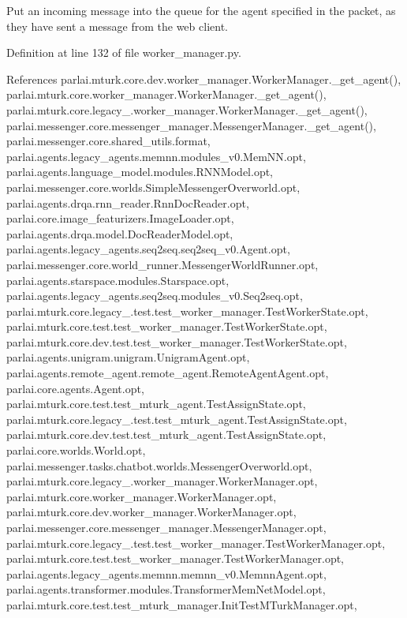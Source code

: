 \begin{DoxyVerb}Put an incoming message into the queue for the agent specified in
the packet, as they have sent a message from the web client.
\end{DoxyVerb}
 

Definition at line 132 of file worker\+\_\+manager.\+py.



References parlai.\+mturk.\+core.\+dev.\+worker\+\_\+manager.\+Worker\+Manager.\+\_\+get\+\_\+agent(), parlai.\+mturk.\+core.\+worker\+\_\+manager.\+Worker\+Manager.\+\_\+get\+\_\+agent(), parlai.\+mturk.\+core.\+legacy\+\_.\+worker\+\_\+manager.\+Worker\+Manager.\+\_\+get\+\_\+agent(), parlai.\+messenger.\+core.\+messenger\+\_\+manager.\+Messenger\+Manager.\+\_\+get\+\_\+agent(), parlai.\+messenger.\+core.\+shared\+\_\+utils.\+format, parlai.\+agents.\+legacy\+\_\+agents.\+memnn.\+modules\+\_\+v0.\+Mem\+N\+N.\+opt, parlai.\+agents.\+language\+\_\+model.\+modules.\+R\+N\+N\+Model.\+opt, parlai.\+messenger.\+core.\+worlds.\+Simple\+Messenger\+Overworld.\+opt, parlai.\+agents.\+drqa.\+rnn\+\_\+reader.\+Rnn\+Doc\+Reader.\+opt, parlai.\+core.\+image\+\_\+featurizers.\+Image\+Loader.\+opt, parlai.\+agents.\+drqa.\+model.\+Doc\+Reader\+Model.\+opt, parlai.\+agents.\+legacy\+\_\+agents.\+seq2seq.\+seq2seq\+\_\+v0.\+Agent.\+opt, parlai.\+messenger.\+core.\+world\+\_\+runner.\+Messenger\+World\+Runner.\+opt, parlai.\+agents.\+starspace.\+modules.\+Starspace.\+opt, parlai.\+agents.\+legacy\+\_\+agents.\+seq2seq.\+modules\+\_\+v0.\+Seq2seq.\+opt, parlai.\+mturk.\+core.\+legacy\+\_.\+test.\+test\+\_\+worker\+\_\+manager.\+Test\+Worker\+State.\+opt, parlai.\+mturk.\+core.\+test.\+test\+\_\+worker\+\_\+manager.\+Test\+Worker\+State.\+opt, parlai.\+mturk.\+core.\+dev.\+test.\+test\+\_\+worker\+\_\+manager.\+Test\+Worker\+State.\+opt, parlai.\+agents.\+unigram.\+unigram.\+Unigram\+Agent.\+opt, parlai.\+agents.\+remote\+\_\+agent.\+remote\+\_\+agent.\+Remote\+Agent\+Agent.\+opt, parlai.\+core.\+agents.\+Agent.\+opt, parlai.\+mturk.\+core.\+test.\+test\+\_\+mturk\+\_\+agent.\+Test\+Assign\+State.\+opt, parlai.\+mturk.\+core.\+legacy\+\_.\+test.\+test\+\_\+mturk\+\_\+agent.\+Test\+Assign\+State.\+opt, parlai.\+mturk.\+core.\+dev.\+test.\+test\+\_\+mturk\+\_\+agent.\+Test\+Assign\+State.\+opt, parlai.\+core.\+worlds.\+World.\+opt, parlai.\+messenger.\+tasks.\+chatbot.\+worlds.\+Messenger\+Overworld.\+opt, parlai.\+mturk.\+core.\+legacy\+\_.\+worker\+\_\+manager.\+Worker\+Manager.\+opt, parlai.\+mturk.\+core.\+worker\+\_\+manager.\+Worker\+Manager.\+opt, parlai.\+mturk.\+core.\+dev.\+worker\+\_\+manager.\+Worker\+Manager.\+opt, parlai.\+messenger.\+core.\+messenger\+\_\+manager.\+Messenger\+Manager.\+opt, parlai.\+mturk.\+core.\+legacy\+\_.\+test.\+test\+\_\+worker\+\_\+manager.\+Test\+Worker\+Manager.\+opt, parlai.\+mturk.\+core.\+test.\+test\+\_\+worker\+\_\+manager.\+Test\+Worker\+Manager.\+opt, parlai.\+agents.\+legacy\+\_\+agents.\+memnn.\+memnn\+\_\+v0.\+Memnn\+Agent.\+opt, parlai.\+agents.\+transformer.\+modules.\+Transformer\+Mem\+Net\+Model.\+opt, parlai.\+mturk.\+core.\+test.\+test\+\_\+mturk\+\_\+manager.\+Init\+Test\+M\+Turk\+Manager.\+opt, 